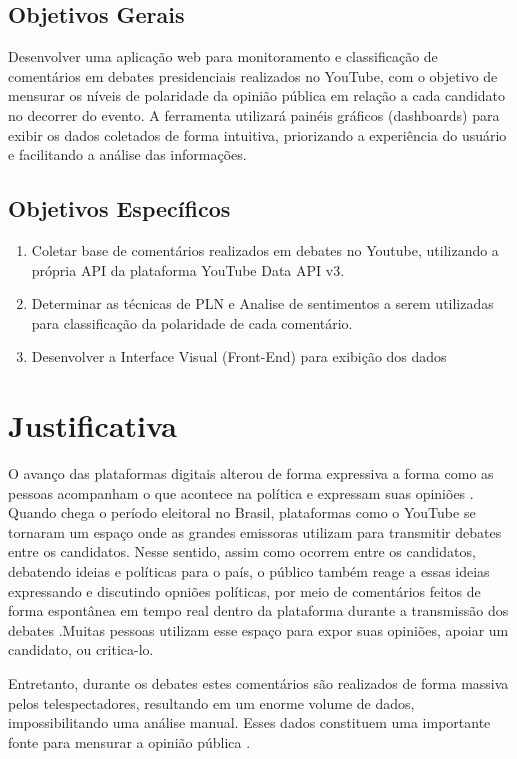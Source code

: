 \documentclass[
	12pt,				%
	openright,			%
	oneside,			%
	a4paper,			%
	english,			%
	brazil				%
	]{abntex2}
\begin{document}
\subsection{Objetivos Gerais}
Desenvolver uma aplicação web para monitoramento e classificação de comentários em debates presidenciais realizados no YouTube, com o objetivo de mensurar os níveis de polaridade da opinião pública em relação a cada candidato no decorrer do evento. A ferramenta utilizará painéis gráficos (dashboards) para exibir os dados coletados de forma intuitiva, priorizando a experiência do usuário e facilitando a análise das informações.
\subsection{Objetivos Específicos}

\begin{enumerate}
    \item Coletar base de comentários realizados em debates no Youtube, utilizando a própria API da plataforma YouTube Data API v3. 
    \item Determinar as técnicas de PLN e Analise de sentimentos a serem utilizadas para classificação da polaridade de cada comentário. 
    \item Desenvolver a Interface Visual (Front-End) para exibição dos dados
\end{enumerate}


\section{Justificativa}
O avanço das plataformas digitais alterou de forma expressiva a forma como as pessoas acompanham o que acontece na política e expressam suas opiniões \cite{Alfaro_2025}. Quando chega o período eleitoral no Brasil, plataformas como o YouTube se tornaram um espaço onde as grandes emissoras utilizam para transmitir debates entre os candidatos. Nesse sentido, assim como ocorrem entre os candidatos, debatendo ideias e políticas para o país, o público também reage a essas ideias expressando e discutindo opniões políticas, por meio de comentários feitos de forma espontânea em tempo real dentro da plataforma durante a transmissão dos debates \cite{Eaton2024}.Muitas pessoas utilizam esse espaço para expor suas opiniões, apoiar um candidato, ou critica-lo.

Entretanto, durante os debates estes comentários são realizados de forma massiva pelos telespectadores, resultando em um enorme volume de dados, impossibilitando uma análise manual\cite{Munger2025}. Esses dados constituem uma importante fonte para mensurar a opinião pública \cite{Eaton2024}.
\end{document}
